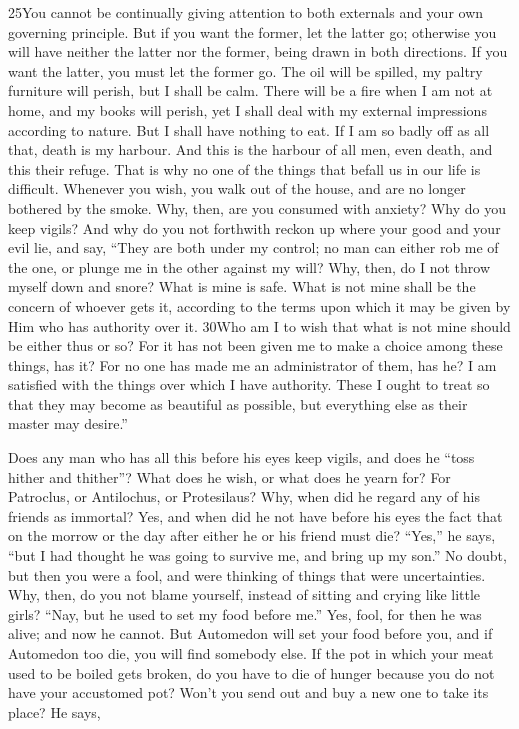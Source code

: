 25You cannot be continually giving attention to both externals and your own governing principle. But if you want the former, let the latter go; otherwise you will have neither the latter nor the former, being drawn in both directions. If you want the latter, you must let the former go. The oil will be spilled, my paltry furniture will perish, but I shall be calm. There will be a fire when I am not at home, and my books will perish, yet I shall deal with my external impressions according to nature. But I shall have nothing to eat. If I am so badly off as all that, death is my harbour. And this is the harbour of all men, even death, and this their refuge. That is why no one of the things that befall us in our life is difficult. Whenever you wish, you walk out of the house, and are no longer bothered by the smoke. Why, then, are you consumed with anxiety? Why do you keep vigils? And why do you not forthwith reckon up where your good and your evil lie, and say, ``They are both under my control; no man can either rob me of the one, or plunge me in the other against my will? Why, then, do I not throw myself down and snore? What is mine is safe. What is not mine shall be the concern of whoever gets it, according to the terms upon which it may be given by Him who has authority over it. 30Who am I to wish that what is not mine should be either thus or so? For it has not been given me to make a choice among these things, has it? For no one has made me an administrator of them, has he? I am satisfied with the things over which I have authority. These I ought to treat so that they may become as beautiful as possible, but everything else as their master may desire.''

Does any man who has all this before his eyes keep vigils, and does he ``toss hither and thither''? What does he wish, or what does he yearn for? For Patroclus, or Antilochus, or Protesilaus? Why, when did he regard any of his friends as immortal? Yes, and when did he not have before his eyes the fact that on the morrow or the day after either he or his friend must die? ``Yes,'' he says, ``but I had thought he was going to survive me, and bring up my son.'' No doubt, but then you were a fool, and were thinking of things that were uncertainties. Why, then, do you not blame yourself, instead of sitting and crying like little girls? ``Nay, but he used to set my food before me.'' Yes, fool, for then he was alive; and now he cannot. But Automedon will set your food before you, and if Automedon too die, you will find somebody else. If the pot in which your meat used to be boiled gets broken, do you have to die of hunger because you do not have your accustomed pot? Won't you send out and buy a new one to take its place? He says,

